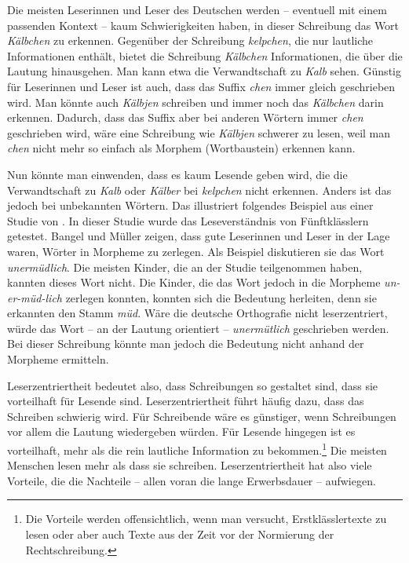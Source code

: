 \label{ea:kelpchen}
\z

Die meisten Leserinnen und Leser des Deutschen werden -- eventuell mit einem passenden Kontext -- kaum Schwierigkeiten haben, in dieser Schreibung das Wort \textit{Kälbchen} zu erkennen. Gegenüber der Schreibung \textit{kelpchen}, die nur lautliche Informationen enthält, bietet die Schreibung \textit{Kälbchen} Informationen, die über die Lautung hinausgehen. Man kann etwa die Verwandtschaft zu \textit{Kalb} sehen. Günstig für Leserinnen und Leser ist auch, dass das Suffix \textit{chen} immer gleich geschrieben wird. Man könnte auch \textit{Kälbjen} schreiben und immer noch das \textit{Kälbchen} darin erkennen. Dadurch, dass das Suffix aber bei anderen Wörtern immer \textit{chen} geschrieben wird, wäre eine Schreibung wie \textit{Kälbjen} schwerer zu lesen, weil man \textit{chen} nicht mehr so einfach als Morphem (Wortbaustein) erkennen kann.

Nun könnte man einwenden, dass es kaum Lesende geben wird, die die Verwandtschaft zu \textit{Kalb} oder \textit{Kälber} bei \textit{kelpchen} nicht erkennen. Anders ist das jedoch bei unbekannten Wörtern. Das illustriert folgendes Beispiel aus einer Studie von \citet{BangelMueller2015}. In dieser Studie wurde das Leseverständnis von Fünftklässlern getestet. Bangel und Müller zeigen, dass gute Leserinnen und Leser in der Lage waren, Wörter in Morpheme zu zerlegen. Als Beispiel diskutieren sie das Wort \textit{unermüdlich}. Die meisten Kinder, die an der Studie teilgenommen haben, kannten dieses Wort nicht. Die Kinder, die das Wort jedoch in die Morpheme \textit{un-er-müd-lich} zerlegen konnten, konnten sich die Bedeutung herleiten, denn sie erkannten den Stamm \textit{müd}. Wäre die deutsche Orthografie nicht leserzentriert, würde das Wort -- an der Lautung orientiert -- \textit{unermütlich} geschrieben werden. Bei dieser Schreibung könnte man jedoch die Bedeutung nicht anhand der Morpheme ermitteln. 


Leserzentriertheit bedeutet also, dass Schreibungen so gestaltet sind, dass sie vorteilhaft für Lesende sind. Leserzentriertheit führt häufig dazu, dass das Schreiben schwierig wird. Für Schreibende wäre es günstiger, wenn Schreibungen vor allem die Lautung wiedergeben würden. Für Lesende hingegen ist es vorteilhaft, mehr als die rein lautliche Information zu bekommen.\footnote{Die Vorteile werden offensichtlich, wenn man versucht, Erstklässlertexte zu lesen oder aber auch Texte aus der Zeit vor der Normierung der Rechtschreibung.} Die meisten Menschen lesen mehr als dass sie schreiben. Leserzentriertheit hat also viele Vorteile, die die Nachteile – allen voran die lange Erwerbsdauer – aufwiegen.


